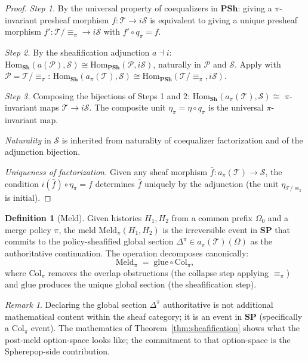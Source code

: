 \documentclass[12pt,a4paper]{article}
\theoremstyle{definition}
\newtheorem{definition}[theorem]{Definition}
\theoremstyle{remark}
\newtheorem{remark}[theorem]{Remark}
\newcommand{\SP}{\mathbf{SP}}
\providecommand{\Hom}{\mathrm{Hom}}
\renewcommand{\Hom}{\mathrm{Hom}}
\newcommand{\Col}{\ensuremath{\mathrm{Col}}}
\newcommand{\Meld}{\mathrm{Meld}}
\newcommand{\PSh}{\mathbf{PSh}}
\newcommand{\Sh}{\mathbf{Sh}}
\begin{document}
\begin{proof}
\textit{Step 1.} By the universal property of coequalizers in $\PSh$: giving a
$\pi$-invariant presheaf morphism $f:\mathcal{T}\to i\mathcal{S}$ is equivalent to
giving a unique presheaf morphism $f':\mathcal{T}/{\equiv_\pi}\to i\mathcal{S}$
with $f'\circ q_\pi=f$.

\textit{Step 2.} By the sheafification adjunction $a\dashv i$:
$\Hom_\Sh(a(\mathcal{P}),\mathcal{S})\cong\Hom_\PSh(\mathcal{P},i\mathcal{S})$,
naturally in $\mathcal{P}$ and $\mathcal{S}$. Apply with $\mathcal{P}=
\mathcal{T}/{\equiv_\pi}$: $\Hom_\Sh(a_\pi(\mathcal{T}),\mathcal{S})
\cong\Hom_\PSh(\mathcal{T}/{\equiv_\pi},i\mathcal{S})$.

\textit{Step 3.} Composing the bijections of Steps 1 and 2:
$\Hom_\Sh(a_\pi(\mathcal{T}),\mathcal{S})\cong$ $\pi$-invariant maps
$\mathcal{T}\to i\mathcal{S}$. The composite unit $\eta_\pi=\eta\circ q_\pi$ is the
universal $\pi$-invariant map.

\textit{Naturality} in $\mathcal{S}$ is inherited from naturality of coequalizer
factorization and of the adjunction bijection.

\textit{Uniqueness of factorization.} Given any sheaf morphism $\bar{f}:
a_\pi(\mathcal{T})\to\mathcal{S}$, the condition $i(\bar{f})\circ\eta_\pi=f$
determines $\bar{f}$ uniquely by the adjunction (the unit $\eta_{\mathcal{T}/\equiv_\pi}$
is initial).
\end{proof}

\begin{definition}[Meld]
\label{def:meld}
Given histories $H_1,H_2$ from a common prefix $\Omega_0$ and a merge policy $\pi$,
the meld $\Meld_\pi(H_1,H_2)$ is the irreversible event in $\SP$ that commits to
the policy-sheafified global section $\Delta^\pi\in a_\pi(\mathcal{T})(\Omega)$ as
the authoritative continuation. The operation decomposes canonically:
\[
  \Meld_\pi \;=\; \mathrm{glue}\circ\Col_\pi,
\]
where $\Col_\pi$ removes the overlap obstructions (the collapse step applying
$\equiv_\pi$) and $\mathrm{glue}$ produces the unique global section
(the sheafification step).
\end{definition}

\begin{remark}
Declaring the global section $\Delta^\pi$ authoritative is not additional mathematical
content within the sheaf category; it is an event in $\SP$ (specifically a $\Col_\pi$
event). The mathematics of Theorem~\ref{thm:sheafification} shows what the
post-meld option-space looks like; the commitment to that option-space is the Spherepop-side
contribution.
\end{remark}
\end{document}
